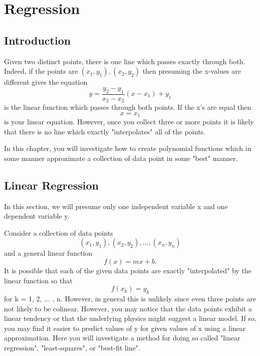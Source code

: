 \documentclass[10pt,]{book}
\theoremstyle{plain}
\theoremstyle{definition}
\theoremstyle{definition}
\theoremstyle{definition}
\numberwithin{equation}{section}
\begin{document}
\chapter[{Regression}]{Regression}\label{CurveEstimation}
\typeout{************************************************}
\typeout{************************************************}
\section[{Introduction}]{Introduction}\label{section-10}

Given two distinct points, there is one line which passes exactly through both.  Indeed, if the points are \((x_1,y_1), (x_2,y_2)\) then presuming the x-values are different gives the equation
\begin{equation*} y = \frac{y_2 - y_1}{x_2 - x_2}(x - x_1) + y_1\end{equation*}
is the linear function which passes through both points.  If the x's are equal then 
\begin{equation*} x = x_1\end{equation*}
is your linear equation. 
However, once you collect three or more points it is likely that there is no line which exactly "interpolates" all of the points.
%
\par

In this chapter, you will investigate how to create polynomial functions which in some manner approximate a collection of data point in some "best" manner.
%
\typeout{************************************************}
\typeout{************************************************}
\section[{Linear Regression}]{Linear Regression}\label{section-11}

In this section, we will presume only one independent variable x and one dependent variable y.
%
\par

Consider a collection of data points 
\begin{equation*}(x_1,y_1), (x_2,y_2), ... , (x_n,y_n)\end{equation*}
and a general linear function 
\begin{equation*}f(x) = mx + b.\end{equation*}
It is possible that each of the given data points are exactly "interpolated" by the linear function so that
\begin{equation*}f(x_k) = y_k\end{equation*}
for k = 1, 2, ... , n.  However, in general this is unlikely since even three points are not likely to be colinear. However, you may notice that the data points exhibit a linear tendency or that the underlying physics might suggest a linear model. If so, you may find it easier to predict values of y for given values of x using a linear approximation. Here you will investigate a method for doing so called "linear regression", "least-squares", or "best-fit line". 
%
\par
\end{document}
